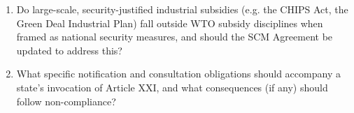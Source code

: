 \begin{enumerate}
  \item Do large-scale, security-justified industrial subsidies (e.g. the CHIPS Act, the Green Deal Industrial Plan) fall outside WTO subsidy disciplines when framed as national security measures, and should the SCM Agreement be updated to address this?
  \item What specific notification and consultation obligations should accompany a state's invocation of Article XXI, and what consequences (if any) should follow non-compliance?
\end{enumerate}
